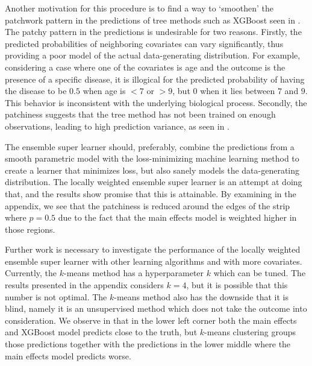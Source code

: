 \documentclass[11pt, a4paper]{article}
\theoremstyle{definition}
\theoremstyle{remark}
\begin{document}
Another motivation for this procedure is to find a way to `smoothen' the patchwork pattern in the predictions of tree methods such as XGBoost seen in . The patchy pattern in the predictions is undesirable for two reasons. Firstly, the predicted probabilities of neighboring covariates can vary significantly, thus providing a poor model of the actual data-generating distribution. For example, considering a case where one of the covariates is age and the outcome is the presence of a specific disease, it is illogical for the predicted probability of having the disease to be $0.5$ when age is $<7$ or $>9$, but $0$ when it lies between $7$ and $9$. This behavior is inconsistent with the underlying biological process. Secondly, the patchiness suggests that the tree method has not been trained on enough observations, leading to high prediction variance, as seen in .

The ensemble super learner should, preferably, combine the predictions from a smooth parametric model with the loss-minimizing machine learning method to create a learner that minimizes loss, but also sanely models the data-generating distribution. The locally weighted ensemble super learner is an attempt at doing that, and the results show promise that this is attainable. By examining  in the appendix, we see that the patchiness is reduced around the edges of the strip where $ p = 0.5 $ due to the fact that the main effects model is weighted higher in those regions.

Further work is necessary to investigate the performance of the locally weighted ensemble super learner with other learning algorithms and with more covariates. Currently, the $ k $-means method has a hyperparameter $ k $ which can be tuned. The results presented in the appendix considers $ k = 4 $, but it is possible that this number is not optimal. The $ k $-means method also has the downside that it is blind, namely it is an unsupervised method which does not take the outcome into consideration. We observe in  that in the lower left corner both the main effects and XGBoost model predicts close to the truth, but $ k $-means clustering groups those predictions together with the predictions in the lower middle where the main effects model predicts worse. 
\end{document}
